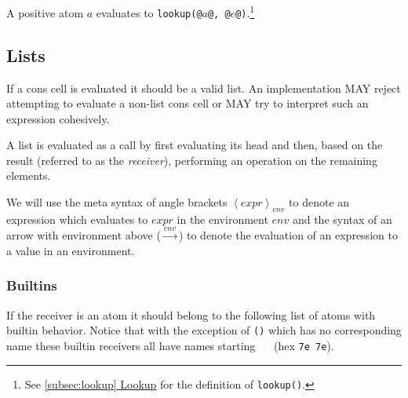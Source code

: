 \documentclass[twocolumn]{report}
\newcommand{\intralink}[2]{\hyperref[#1]{\ref*{#1} #2}}
\begin{document}
A positive atom $a$ evaluates to \texttt{lookup(@$a$@, @$e$@)}.\footnote{See \intralink{subsec:lookup}{Lookup} for the definition of \texttt{lookup()}.}

\subsection{Lists}
\label{sec:eval_list}

If a cons cell is evaluated it should be a valid list.
An implementation MAY reject attempting to evaluate a non-list cons cell or MAY try to interpret such an expression cohesively.

A list is evaluated as a call by first evaluating its head and then, based on the result (referred to as the \emph{receiver}), performing an operation on the remaining elements.

We will use the meta syntax of angle brackets $\left\langle expr \right\rangle_{env}$ to denote an expression which evaluates to $expr$ in the environment $env$ and the syntax of an arrow with environment above ($\xrightarrow{env}$) to denote the evaluation of an expression to a value in an environment.

\subsubsection{Builtins}
\label{subsubsec:eval_builtin}

If the receiver is an atom it should belong to the following list of atoms with builtin behavior.
Notice that with the exception of \texttt{()} which has no corresponding name these builtin receivers all have names starting \texttt{~~} (hex \texttt{7e 7e}).
\end{document}
